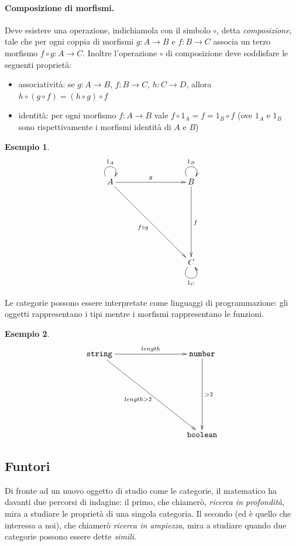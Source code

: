 \documentclass[12pt]{article}
\newtheorem{example}{Esempio}
\begin{document}
\paragraph{Composizione di morfismi.} Deve esistere una operazione, indichiamola con il simbolo $\circ$, detta \emph{composizione}, tale che per ogni coppia di morfismi $g: A \rightarrow B$
e $f: B \rightarrow C$ associa un terzo morfismo $f \circ g: A \rightarrow C$. Inoltre l'operazione $\circ$ di composizione deve soddisfare le seguenti proprietà:

\begin{itemize}
  \item associatività: se $g: A \rightarrow B$, $f: B \rightarrow C$, $h: C \rightarrow D$, allora $h \circ (g \circ f) = (h \circ g) \circ f$
  \item identità: per ogni morfismo $f: A \rightarrow B$ vale $f \circ 1_A = f = 1_B \circ f$ (ove $1_A$ e $1_B$ sono rispettivamente i morfismi identità di $A$ e $B$)
\end{itemize}

\begin{example}
\[
\xymatrixrowsep{3cm}
\xymatrixcolsep{3cm}
\xymatrix{
  A \ar@(ul,ur)^{1_A} \ar[r]^g \ar[rd]_{f \circ g} & B \ar@(ul,ur)^{1_B} \ar[d]^f \\
    & C \ar@(dl,dr)_{1_C}
}
\]
\end{example}

Le categorie possono essere interpretate come linguaggi di programmazione: gli oggetti rappresentano i tipi mentre i morfismi
rappresentano le funzioni.

\begin{example}
\[
\xymatrixrowsep{3cm}
\xymatrixcolsep{3cm}
\xymatrix{
  {\texttt{string}} \ar[r]^{length} \ar[rd]_{length > 2} & {\texttt{number}} \ar[d]^{> 2} \\
    & {\texttt{boolean}}
}
\]
\end{example}

\subsection{Funtori}

Di fronte ad un nuovo oggetto di studio come le categorie, il matematico ha davanti due percorsi di indagine: il primo, che chiamerò, \emph{ricerca in profondità},
mira a studiare le proprietà di una singola categoria. Il secondo (ed è quello che interessa a noi), che chiamerò \emph{ricerca in ampiezza},
mira a studiare quando due categorie possono essere dette \emph{simili}.
\end{document}

